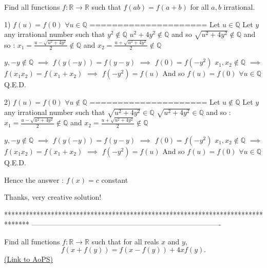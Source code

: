 \begin{solution}
	\begin{tcolorbox}Find all functions $ f : \mathbb{R} \to \mathbb{R}$ such that $ f(ab)= f(a+b)$ for all $a, b$ irrational.\end{tcolorbox}
1) $f(u)=f(0)$ $\forall u\in\mathbb Q$
=====================
Let $u\in\mathbb Q$
Let $y$ any irrational number such that $y^2\notin \mathbb Q$
$u^2+4y^2\notin\mathbb Q$ and so $\sqrt{u^2+4y^2}\notin\mathbb Q$ and so :
$x_1=\frac{u-\sqrt{u^2+4y^2}}2\notin\mathbb Q$ and $x_2=\frac{u+\sqrt{u^2+4y^2}}2\notin\mathbb Q$

$y,-y\notin\mathbb Q$ $\implies$ $f(y(-y))=f(y-y)$ $\implies$ $f(0)=f(-y^2)$
$x_1,x_2\notin\mathbb Q$ $\implies$ $f(x_1x_2)=f(x_1+x_2)$ $\implies$ $f(-y^2)=f(u)$
And so $f(u)=f(0)$ $\forall u\in\mathbb Q$
Q.E.D.

2) $f(u)=f(0)$ $\forall u\notin\mathbb Q$
=====================
Let $u\notin\mathbb Q$
Let $y$ any irrational number such that $\sqrt{u^2+4y^2}\in \mathbb Q$ 
$\sqrt{u^2+4y^2}\in\mathbb Q$ and so :
$x_1=\frac{u-\sqrt{u^2+4y^2}}2\notin\mathbb Q$ and $x_2=\frac{u+\sqrt{u^2+4y^2}}2\notin\mathbb Q$

$y,-y\notin\mathbb Q$ $\implies$ $f(y(-y))=f(y-y)$ $\implies$ $f(0)=f(-y^2)$
$x_1,x_2\notin\mathbb Q$ $\implies$ $f(x_1x_2)=f(x_1+x_2)$ $\implies$ $f(-y^2)=f(u)$
And so $f(u)=f(0)$ $\forall u\in\mathbb Q$
Q.E.D.


Hence the answer : $\boxed{f(x)=c}$ constant
\end{solution}



\begin{solution}
	Thanks, very creative solution!
\end{solution}
*******************************************************************************
-------------------------------------------------------------------------------

\begin{problem}
	Find all functions $f: \mathbb R \to \mathbb R$ such that for all reals $x$ and $y$,
\[f(x + f(y)) = f(x - f(y)) + 4xf(y).\]
	\flushright \href{https://artofproblemsolving.com/community/c6h415924}{(Link to AoPS)}
\end{problem}



